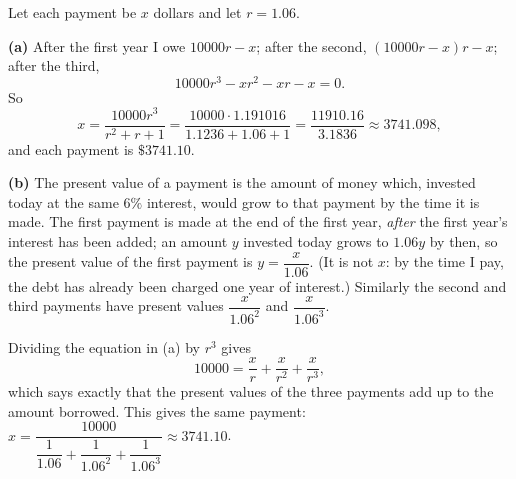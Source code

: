 Let each payment be $x$ dollars and let $r=1.06$.

\textbf{(a)} After the first year I owe $10000r-x$; after the second, $(10000r-x)r-x$; after the third,
\[10000r^3-xr^2-xr-x=0 .\]
So
\[x=\dfrac{10000r^3}{r^2+r+1}=\dfrac{10000\cdot1.191016}{1.1236+1.06+1}=\dfrac{11910.16}{3.1836}\approx3741.098,\]
and each payment is $\boxed{\$3741.10}$.

\textbf{(b)} The present value of a payment is the amount of money which, invested today at the same $6\%$ interest, would grow to that payment by the time it is made. The first payment is made at the end of the first year, \emph{after} the first year's interest has been added; an amount $y$ invested today grows to $1.06y$ by then, so the present value of the first payment is $y=\dfrac{x}{1.06}$. (It is not $x$: by the time I pay, the debt has already been charged one year of interest.) Similarly the second and third payments have present values $\dfrac{x}{1.06^2}$ and $\dfrac{x}{1.06^3}$.

Dividing the equation in (a) by $r^3$ gives
\[10000=\dfrac{x}{r}+\dfrac{x}{r^2}+\dfrac{x}{r^3},\]
which says exactly that the present values of the three payments add up to the amount borrowed. This gives the same payment: $x=\dfrac{10000}{\dfrac{1}{1.06}+\dfrac{1}{1.06^2}+\dfrac{1}{1.06^3}}\approx3741.10$.

